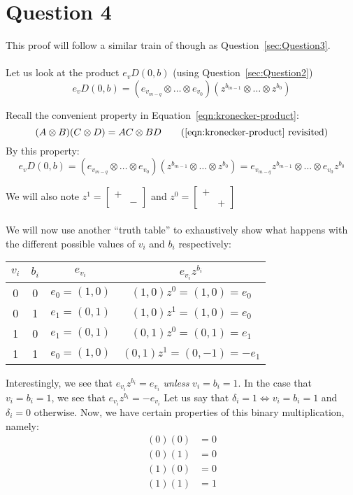 \documentclass[letterpaper]{article}
\begin{document}
\section{Question 4}
\label{sec:Question4}

This proof will follow a similar train of though as Question~\ref{sec:Question3}.
\\ \\
Let us look at the product $ e_v D(0, b) $ (using Question~\ref{sec:Question2})
\[
e_v D(0, b) = (e_{v_{m - q}} \otimes \ldots \otimes e_{v_0})(z^{b_{m - 1}} \otimes \ldots \otimes z^{b_{0}})
\]

Recall the convenient property in Equation~\ref{eqn:kronecker-product}:
\begin{equation}
(A \otimes B) (C \otimes D) = AC \otimes BD
\tag{\ref{eqn:kronecker-product} revisited}
\end{equation}
By this property:
\[
e_v D(0, b) = (e_{v_{m - q}} \otimes \ldots \otimes e_{v_0})(z^{b_{m - 1}} \otimes \ldots \otimes z^{b_{0}}) = e_{v_{m - q}} z^{b_{m - 1}} \otimes \ldots \otimes e_{v_0}z^{b_{0}}
\]

We will also note $ z^1 = \begin{bmatrix} + & \\ & - \end{bmatrix} $ and $ z^0 = \begin{bmatrix} + & \\ & + \end{bmatrix} $
\\ \\
We will now use another ``truth table'' to exhaustively show what happens with the different possible values of $ v_i $ and $ b_i $ respectively:

\begin{center}
\begin{tabular}{c | c | c | c }
\hline
$ v_i $ & $ b_i $ & $ e_{v_i} $ & $ e_{v_i} z^{b_i} $ \\
\hline
\hline
 0 & 0 & $ e_0 = (1, 0) $ & $ (1, 0) z^0 = (1, 0) = e_0 $ \\
 0 & 1 & $ e_1 = (0, 1) $ & $ (1, 0) z^1 = (1, 0) = e_0 $ \\
 1 & 0 & $ e_1 = (0, 1) $ & $ (0, 1) z^0 = (0, 1) = e_1 $ \\
 1 & 1 & $ e_0 = (1, 0) $ & $ (0, 1) z^1 = (0, -1) = -e_1 $

\end{tabular}
\end{center}

Interestingly, we see that $ e_{v_i} z^{b_i} = e_{v_i} $ \textit{unless} $ v_i = b_i = 1 $.
In the case that $ v_i = b_i = 1 $, we see that $ e_{v_i} z^{b_i} = -e_{v_i} $
Let us say that $ \delta_i = 1 \iff v_i = b_i = 1 $ and $ \delta_i = 0 $ otherwise.
Now, we have certain properties of this binary multiplication, namely:
\begin{align*}
    (0)(0) &= 0 \\
    (0)(1) &= 0 \\
    (1)(0) &= 0 \\
    (1)(1) &= 1
\end{align*}
\end{document}
